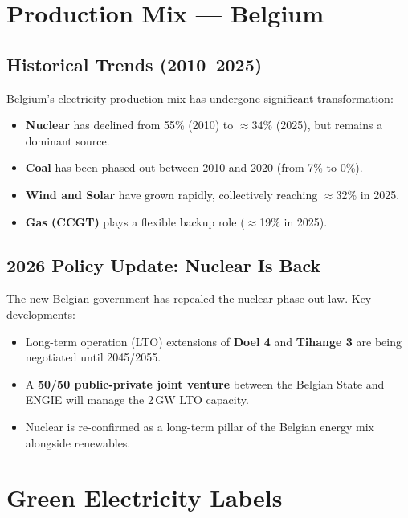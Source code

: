 \section{Production Mix — Belgium}

\subsection*{Historical Trends (2010–2025)}

Belgium's electricity production mix has undergone significant transformation:

\begin{itemize}[noitemsep]
    \item \textbf{Nuclear} has declined from 55\% (2010) to $\approx$34\% (2025), but remains a dominant source.
    \item \textbf{Coal} has been phased out between 2010 and 2020 (from 7\% to 0\%).
    \item \textbf{Wind and Solar} have grown rapidly, collectively reaching $\approx$32\% in 2025.
    \item \textbf{Gas (CCGT)} plays a flexible backup role ($\approx$19\% in 2025).
\end{itemize}

\subsection*{2026 Policy Update: Nuclear Is Back}

The new Belgian government has repealed the nuclear phase-out law. Key developments:
\begin{itemize}[noitemsep]
    \item Long-term operation (LTO) extensions of \textbf{Doel 4} and \textbf{Tihange 3} are being negotiated until 2045/2055.
    \item A \textbf{50/50 public-private joint venture} between the Belgian State and ENGIE will manage the 2\,GW LTO capacity.
    \item Nuclear is re-confirmed as a long-term pillar of the Belgian energy mix alongside renewables.
\end{itemize}

\section{Green Electricity Labels}


